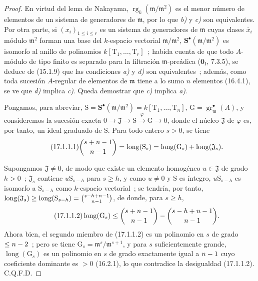 \begin{proof}
En virtud del lema de Nakayama,
$\operatorname{rg}_k(\mathfrak{m}/\mathfrak{m}^2)$ es el menor número de
elementos de un sistema de generadores de $\mathfrak{m}$, por lo que \emph{b)} y \emph{c)} son
equivalentes. Por otra parte, si $(x_i)_{1\leq i\leq r}$ es un sistema de
generadores de $\mathfrak{m}$ cuyas clases $\overline{x}_i$ módulo
$\mathfrak{m}^2$ forman una base del $k$-espacio vectorial
$\mathfrak{m}/\mathfrak{m}^2$, $\mathbf{S}^\bullet(\mathfrak{m}/\mathfrak{m}^2)$
es isomorfo al anillo de
polinomios $k[\mathrm{T}_1,\ldots,\mathrm{T}_r]$~; habida cuenta de que todo
$A$-módulo de tipo finito es separado para la filtración $\mathfrak{m}$-preádica
($\mathbf{0}_{\mathrm I}$, 7.3.5), se deduce de (15.1.9) que las condiciones \emph{a)} y \emph{d)}
son equivalentes~; además, como toda sucesión $A$-regular de elementos de
$\mathfrak{m}$ tiene a lo sumo $n$ elementos (16.4.1), se ve que \emph{d)} implica \emph{c)}.
Queda demostrar que \emph{c)} implica \emph{a)}.

Pongamos, para abreviar,
$\mathrm{S}=\mathbf{S}^\bullet(\mathfrak{m}/\mathfrak{m}^2)
=k[\mathrm{T}_1,\ldots,\mathrm{T}_n]$,
$\mathrm{G}=\operatorname{gr}^\bullet_{\mathfrak{m}}(A)$, y consideremos la sucesión
exacta
$0\longrightarrow\mathfrak{J}\longrightarrow\mathrm{S}
\xrightarrow{\varphi}\mathrm{G}\longrightarrow0$, donde el núcleo
$\mathfrak{J}$ de $\varphi$ es, por tanto, un ideal graduado de $\mathrm{S}$. Para
todo entero $s>0$, se tiene
\begin{equation}
\label{0.17.1.1.1-fr}
\tag{17.1.1.1}
  \binom{s+n- 1}{n- 1}
  =\operatorname{long}(\mathrm{S}_s)
  =\operatorname{long}(\mathrm{G}_s)
  +\operatorname{long}(\mathfrak{J}_s).
\end{equation}

Supongamos $\mathfrak{J}\neq0$, de modo que existe un elemento homogéneo
$u\in\mathfrak{J}$ de grado $h>0$~; $\mathfrak{J}_s$ contiene
$u\mathrm{S}_{s-h}$ para $s\geq h$, y como $u\neq0$ y $\mathrm{S}$ es
íntegro, $u\mathrm{S}_{s-h}$ es isomorfo a $\mathrm{S}_{s-h}$ como
$k$-espacio vectorial~; se tendría, por tanto,
$\operatorname{long}(\mathfrak{J}_s)\geq
\operatorname{long}(\mathrm{S}_{s-h})=\binom{s- h+n- 1}{n- 1}$, de donde, para
$s\geq h$,
\begin{equation}
\label{0.17.1.1.2-fr}
\tag{17.1.1.2}
  \operatorname{long}(\mathrm{G}_s)
  \leq\binom{s+n- 1}{n- 1}-\binom{s- h+n- 1}{n- 1}.
\end{equation}
Ahora bien, el segundo miembro de (17.1.1.2) es un polinomio en $s$ de grado
$\leq n- 2$~; pero se tiene
$\mathrm{G}_s=\mathfrak{m}^s/\mathfrak{m}^{s+1}$, y para $s$ suficientemente grande,
$\operatorname{long}(\mathrm{G}_s)$ es un polinomio en $s$ de grado exactamente
igual a $n- 1$ cuyo coeficiente dominante es $>0$ (16.2.1), lo que contradice
la desigualdad (17.1.1.2). C.Q.F.D.
\end{proof}

